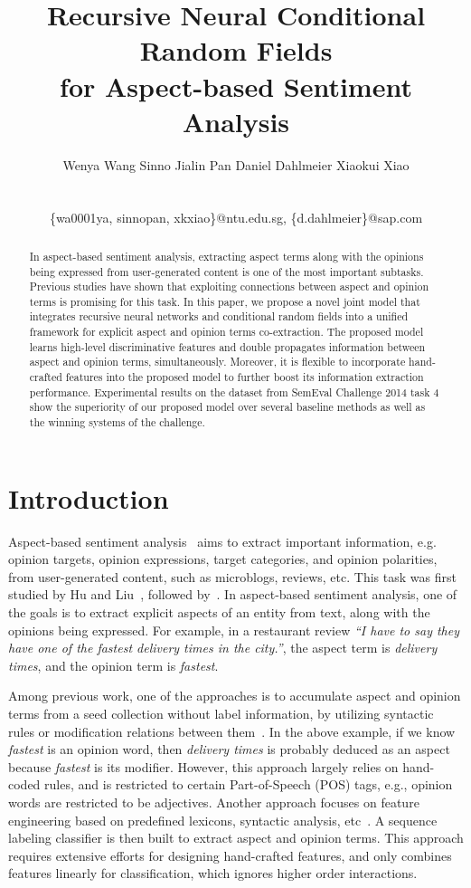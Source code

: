 \documentclass[11pt,letterpaper]{article}
\title{Recursive Neural Conditional Random Fields \\for Aspect-based Sentiment Analysis}
\author{Wenya Wang\affmark[\dag\ddag]
        \hspace{3mm}
        Sinno Jialin Pan\affmark[\dag]
        \hspace{3mm}
        Daniel Dahlmeier\affmark[\ddag]
        \hspace{3mm}
        Xiaokui Xiao\affmark[\dag]
        \\
        \affaddr{\affmark[\dag]Nanyang Technological University, Singapore} \\
        \affaddr{\affmark[\ddag]SAP Innovation Center Singapore} \\
        \affmark[\dag]\{wa0001ya, sinnopan, xkxiao\}@ntu.edu.sg, \affmark[\ddag]\{d.dahlmeier\}@sap.com
        }
\date{}
\begin{document}
\maketitle

\begin{abstract}
In aspect-based sentiment analysis, extracting aspect terms along with the opinions being expressed from user-generated content is one of the most important subtasks. Previous studies have shown that exploiting connections between aspect and opinion terms is promising for this task. In this paper, we propose a novel joint model that integrates recursive neural networks and conditional random fields into a unified framework for explicit aspect and opinion terms co-extraction. The proposed model learns high-level discriminative features and double propagates information between aspect and opinion terms, simultaneously. Moreover, it is flexible to incorporate hand-crafted features into the proposed model to further boost its information extraction performance. Experimental results on the dataset from SemEval Challenge 2014 task 4 show the superiority of our proposed model over several baseline methods as well as the winning systems of the challenge.
\end{abstract}

\section{Introduction}\label{sec:intro}

Aspect-based sentiment analysis~\cite{Pang:2008:OMS:1454711.1454712,DBLP:series/dcsa/Liu11} aims to extract important information, e.g. opinion targets, opinion expressions, target categories, and opinion polarities, from user-generated content, such as microblogs, reviews, etc. This task was first studied by Hu and Liu~, followed by~\cite{Pop05,Zhuang06,Zhang10,Qiu11,Li10}. In aspect-based sentiment analysis, one of the goals is to extract explicit aspects of an entity from text, along with the opinions being expressed. For example, in a restaurant review \textit{``I have to say they have one of the fastest delivery times in the city.''}, the aspect term is \textit{delivery times}, and the opinion term is \textit{fastest}.

Among previous work, one of the approaches is to accumulate aspect and opinion terms from a seed collection without label information, by utilizing syntactic rules or modification relations between them~\cite{Qiu11,DBLP:conf/webi/LiuGLZ13}. In the above example, if we know \textit{fastest} is an opinion word, then \textit{delivery times} is probably deduced as an aspect because \textit{fastest} is its modifier. However, this approach largely relies on hand-coded rules, and is restricted to certain Part-of-Speech (POS) tags, e.g., opinion words are restricted to be adjectives. Another approach focuses on feature engineering based on predefined lexicons, syntactic analysis, etc~\cite{Jin09,Li10}. A sequence labeling classifier is then built to extract aspect and opinion terms. This approach requires extensive efforts for designing hand-crafted features, and only combines features linearly for classification, which ignores higher order interactions.
\end{document}
